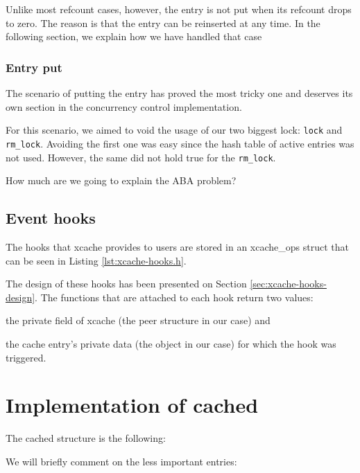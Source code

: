 Unlike most refcount cases, however, the entry is not put when its refcount 
drops to zero. The reason is that the entry can be reinserted at any time. In 
the following section, we explain how we have handled that case

\subsubsection{Entry put}

The scenario of putting the entry has proved the most tricky one and deserves 
its own section in the concurrency control implementation.

For this scenario, we aimed to void the usage of our two biggest lock: 
\texttt{lock} and \texttt{rm\_lock}. Avoiding the first one was easy since the 
hash table of active entries was not used. However, the same did not hold true 
for the \texttt{rm\_lock}.

\fixme How much are we going to explain the ABA problem?

\subsection{Event hooks}

The hooks that xcache provides to users are stored in an xcache\_ops struct 
that can be seen in Listing \ref{lst:xcache-hooks.h}.


The design of these hooks has been presented on Section 
\ref{sec:xcache-hooks-design}. The functions that are attached to each hook 
return two values:
\begin{inparaenum}
\item the private field of xcache (the peer structure in our case) and
\item the cache entry's private data (the object in our case) for which the 
	hook was triggered.
\end{inparaenum}

\section{Implementation of cached}\label{sec:cached-imp}

The cached structure is the following:


We will briefly comment on the less important entries:

